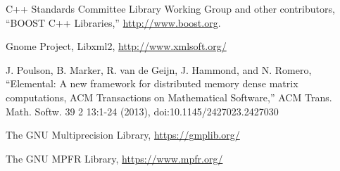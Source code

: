 \documentclass[12pt]{article}
\numberwithin{equation}{section}
\begin{document}
\begin{thebibliography}{9}
  C++ Standards Committee Library Working Group and other contributors,
  ``BOOST C++ Libraries,''
  \href{http://www.boost.org}{http://www.boost.org}.

  Gnome Project,
  Libxml2,
  \href{http://www.xmlsoft.org/}{http://www.xmlsoft.org/}

  J. Poulson, B. Marker, R. van de Geijn, J. Hammond, and N. Romero,
  ``Elemental: A new framework for distributed memory dense matrix computations, ACM Transactions on Mathematical Software,''
  ACM Trans. Math. Softw. 39 2 13:1-24 (2013),
  doi:10.1145/2427023.2427030
  
  The GNU Multiprecision Library,
  \href{https://gmplib.org/}{https://gmplib.org/}

  The GNU MPFR Library,
  \href{https://www.mpfr.org/}{https://www.mpfr.org/}

\end{thebibliography}
\end{document}
